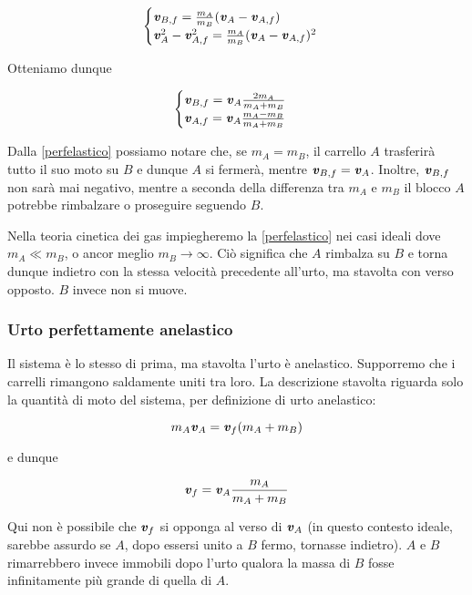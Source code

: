 \[
\begin{cases}
    \textbf{\textit{v}}_{B,f} = \frac{m_A}{m_B}(\textbf{\textit{v}}_A - \textbf{\textit{v}}_{A,f})\\
    \textbf{\textit{v}}_A^2 - \textbf{\textit{v}}_{A,f}^2 = \frac{m_A}{m_B}(\textbf{\textit{v}}_A - \textbf{\textit{v}}_{A,f})^2
\end{cases}
\]

\noindent Otteniamo dunque

\begin{align}
\begin{cases}
    \textbf{\textit{v}}_{B,f} = \textbf{\textit{v}}_A\frac{2m_A}{m_A + m_B}\\
    \textbf{\textit{v}}_{A,f} = \textbf{\textit{v}}_A\frac{m_A - m_B}{m_A + m_B}
\end{cases}\label{perfelastico}
\end{align}

\noindent Dalla \ref{perfelastico} possiamo notare che, se $m_A = m_B$,
il carrello $A$ trasferirà tutto il suo moto su $B$ e dunque $A$ si fermerà,
mentre $\textbf{\textit{v}}_{B,f} = \textbf{\textit{v}}_A$. Inoltre, $\textbf{\textit{v}}_{B,f}$
non sarà mai negativo, mentre a seconda della differenza tra $m_A$ e $m_B$
il blocco $A$ potrebbe rimbalzare o proseguire seguendo $B$.

Nella teoria cinetica dei gas impiegheremo la \ref{perfelastico} nei
casi ideali dove $m_A \ll m_B$, o ancor meglio $m_B \to \infty$. Ciò significa
che $A$ rimbalza su $B$ e torna dunque indietro con la stessa velocità
precedente all'urto, ma stavolta con verso opposto. $B$ invece non si
muove.


\subsubsection*{Urto perfettamente anelastico}
Il sistema è lo stesso di prima, ma stavolta l'urto è anelastico.
Supporremo che i carrelli rimangono saldamente uniti tra loro. La
descrizione stavolta riguarda solo la quantità di moto del sistema,
per definizione di urto anelastico:

\[
m_A\textbf{\textit{v}}_A = \textbf{\textit{v}}_f(m_A + m_B)
\]

\noindent e dunque

\[
\textbf{\textit{v}}_f = \textbf{\textit{v}}_A \frac{m_A}{m_A + m_B}
\]

\noindent Qui non è possibile che $\textbf{\textit{v}}_f$ si opponga al
verso di $\textbf{\textit{v}}_A$ (in questo contesto ideale, sarebbe assurdo
se $A$, dopo essersi unito a $B$ fermo, tornasse indietro). $A$
e $B$ rimarrebbero invece immobili dopo l'urto qualora la massa di
$B$ fosse infinitamente più grande di quella di $A$.